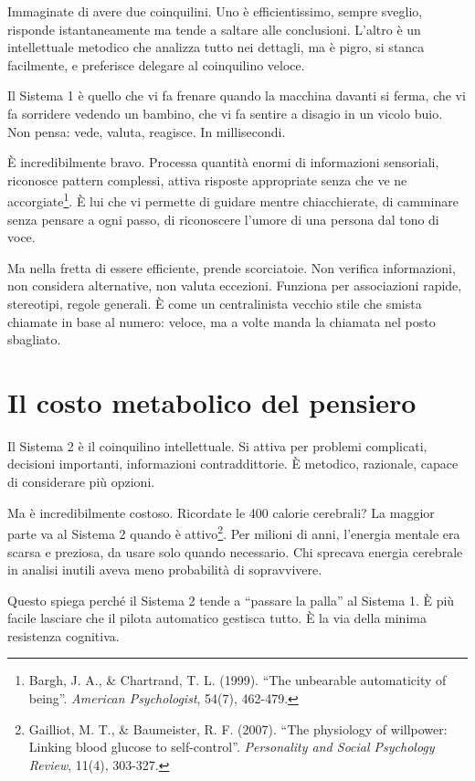 Immaginate di avere due coinquilini. Uno è efficientissimo, sempre sveglio, risponde istantaneamente ma tende a saltare alle conclusioni. L'altro è un intellettuale metodico che analizza tutto nei dettagli, ma è pigro, si stanca facilmente, e preferisce delegare al coinquilino veloce.

Il Sistema 1 è quello che vi fa frenare quando la macchina davanti si ferma, che vi fa sorridere vedendo un bambino, che vi fa sentire a disagio in un vicolo buio. Non pensa: vede, valuta, reagisce. In millisecondi.

È incredibilmente bravo. Processa quantità enormi di informazioni sensoriali, riconosce pattern complessi, attiva risposte appropriate senza che ve ne accorgiate\footnote{Bargh, J. A., \& Chartrand, T. L. (1999). ``The unbearable automaticity of being''. \textit{American Psychologist}, 54(7), 462-479.}. È lui che vi permette di guidare mentre chiacchierate, di camminare senza pensare a ogni passo, di riconoscere l'umore di una persona dal tono di voce.

Ma nella fretta di essere efficiente, prende scorciatoie. Non verifica informazioni, non considera alternative, non valuta eccezioni. Funziona per associazioni rapide, stereotipi, regole generali. È come un centralinista vecchio stile che smista chiamate in base al numero: veloce, ma a volte manda la chiamata nel posto sbagliato.

\section{Il costo metabolico del pensiero}

Il Sistema 2 è il coinquilino intellettuale. Si attiva per problemi complicati, decisioni importanti, informazioni contraddittorie. È metodico, razionale, capace di considerare più opzioni.

Ma è incredibilmente costoso. Ricordate le 400 calorie cerebrali? La maggior parte va al Sistema 2 quando è attivo\footnote{Gailliot, M. T., \& Baumeister, R. F. (2007). ``The physiology of willpower: Linking blood glucose to self-control''. \textit{Personality and Social Psychology Review}, 11(4), 303-327.}. Per milioni di anni, l'energia mentale era scarsa e preziosa, da usare solo quando necessario. Chi sprecava energia cerebrale in analisi inutili aveva meno probabilità di sopravvivere.

Questo spiega perché il Sistema 2 tende a ``passare la palla'' al Sistema 1. È più facile lasciare che il pilota automatico gestisca tutto. È la via della minima resistenza cognitiva.

